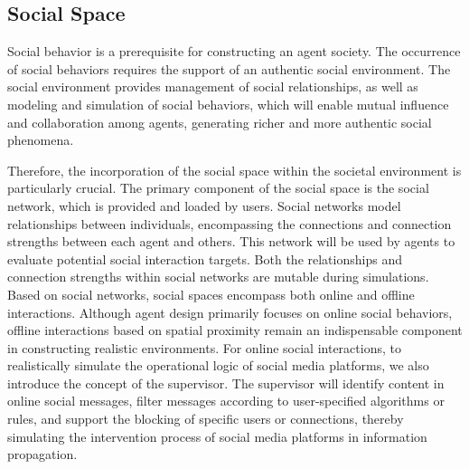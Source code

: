 \subsection{Social Space}


Social behavior is a prerequisite for constructing an agent society.
The occurrence of social behaviors requires the support of an authentic social environment.
The social environment provides management of social relationships, as well as modeling and simulation of social behaviors, which will enable mutual influence and collaboration among agents, generating richer and more authentic social phenomena.

Therefore, the incorporation of the social space within the societal environment is particularly crucial.
The primary component of the social space is the social network, which is provided and loaded by users.
Social networks model relationships between individuals, encompassing the connections and connection strengths between each agent and others.
This network will be used by agents to evaluate potential social interaction targets.
Both the relationships and connection strengths within social networks are mutable during simulations.
Based on social networks, social spaces encompass both online and offline interactions.
Although agent design primarily focuses on online social behaviors, offline interactions based on spatial proximity remain an indispensable component in constructing realistic environments.
For online social interactions, to realistically simulate the operational logic of social media platforms, we also introduce the concept of the supervisor.
The supervisor will identify content in online social messages, filter messages according to user-specified algorithms or rules, and support the blocking of specific users or connections, thereby simulating the intervention process of social media platforms in information propagation.

